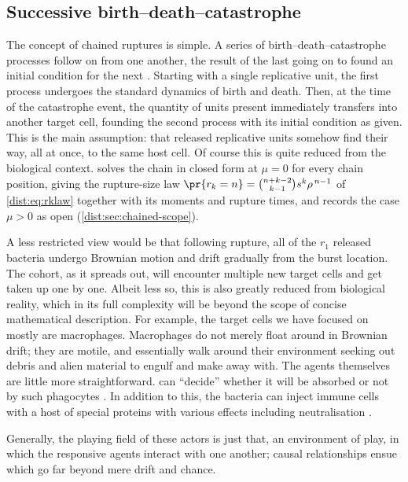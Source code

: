 \subsection{Successive birth--death--catastrophe}
\label{path:sec:chainedruptures}

The concept of chained ruptures is simple. A series of
birth--death--catastrophe processes follow on from one another, the result
of the last going on to found an initial condition for the next
\cite{brockwell1986extinction,stirzaker2006processes,di2008note}. Starting
with a single replicative unit, the first process undergoes the standard
dynamics of birth and death. Then, at the time of the catastrophe event, the
quantity of units present immediately transfers into another target cell,
founding the second process with its initial condition as given. This is the
main assumption: that released replicative units somehow find their way, all
at once, to the same host cell. Of course this is quite reduced from the
biological context. \ChDistcap{} solves the chain in closed form at $\mu=0$ for
every chain position, giving the rupture-size law $\pr{r_k=n} =
\binom{n+k-2}{k-1}s^k\rho^{\,n-1}$ of \cref{dist:eq:rklaw} together with its
moments and rupture times, and records the case $\mu>0$ as open
(\cref{dist:sec:chained-scope}).

A less restricted view would be that following rupture, all of the $r_1$
released bacteria undergo Brownian motion and drift gradually from the burst
location. The cohort, as it spreads out, will encounter multiple new target
cells and get taken up one by one. Albeit less so, this is also greatly
reduced from biological reality, which in its full complexity will be beyond
the scope of concise mathematical description. For example, the target cells
we have focused on mostly are macrophages. Macrophages do not merely float
around in Brownian drift; they are motile, and essentially walk around their
environment seeking out debris and alien material to engulf and make away
with. The agents themselves are little more straightforward. \yp{} can
``decide'' whether it will be absorbed or not by such phagocytes
\cite{MonackEtAl1997,PujolBliska2005}. In addition to this, the bacteria can
inject immune cells with a host of special proteins with various effects
including neutralisation \cite{KeEtAl2013}.

Generally, the playing field of these actors is just that, an environment of
play, in which the responsive agents interact with one another; causal
relationships ensue which go far beyond mere drift and chance.


